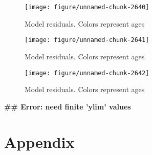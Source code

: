 \documentclass[a4paper]{article}\usepackage{graphicx, color}
\makeatletter
\def\maxwidth{ %
  \ifdim\Gin@nat@width>\linewidth
    \linewidth
  \else
    \Gin@nat@width
  \fi
}
\newenvironment{kframe}{%
 \def\at@end@of@kframe{}%
 \ifinner\ifhmode%
  \def\at@end@of@kframe{\end{minipage}}%
  \begin{minipage}{\columnwidth}%
 \fi\fi%
 \def\FrameCommand##1{\hskip\@totalleftmargin \hskip-\fboxsep
 \colorbox{shadecolor}{##1}\hskip-\fboxsep
     \hskip-\linewidth \hskip-\@totalleftmargin \hskip\columnwidth}%
 \MakeFramed {\advance\hsize-\width
   \@totalleftmargin\z@ \linewidth\hsize
   \@setminipage}}%
 {\par\unskip\endMakeFramed%
 \at@end@of@kframe}
\newenvironment{knitrout}{}{} %
\makeatother
\begin{document}
\begin{knitrout}
\begin{figure}[H]
{\centering \texttt{[image: figure/unnamed-chunk-2640]} 

}

\caption[Model residuals]{Model residuals. Colors represent ages\label{fig:unnamed-chunk-2640}}
\end{figure}
\begin{figure}[H]


{\centering \texttt{[image: figure/unnamed-chunk-2641]} 

}

\caption[Model residuals]{Model residuals. Colors represent ages\label{fig:unnamed-chunk-2641}}
\end{figure}
\begin{figure}[H]


{\centering \texttt{[image: figure/unnamed-chunk-2642]} 

}

\caption[Model residuals]{Model residuals. Colors represent ages\label{fig:unnamed-chunk-2642}}
\end{figure}
\begin{kframe}

{\ttfamily\noindent\bfseries\textcolor{errorcolor}{\#\# Error: need finite 'ylim' values}}\end{kframe}
\end{knitrout}



\section*{Appendix}
\end{document}

